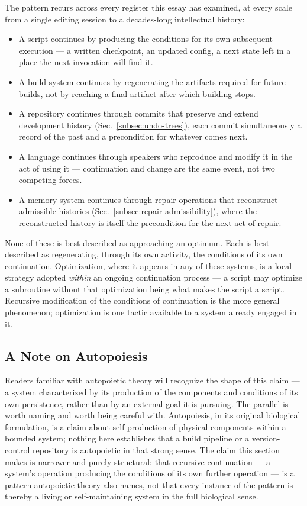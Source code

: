 \documentclass[12pt,a4paper]{article}
\theoremstyle{plain}
\theoremstyle{definition}
\theoremstyle{remark}
\begin{document}
The pattern recurs across every register this essay has examined, at every scale from a single editing session to a decades-long intellectual history:
\begin{itemize}
  \item A script continues by producing the conditions for its own subsequent execution — a written checkpoint, an updated config, a next state left in a place the next invocation will find it.
  \item A build system continues by regenerating the artifacts required for future builds, not by reaching a final artifact after which building stops.
  \item A repository continues through commits that preserve and extend development history (Sec.~\ref{subsec:undo-trees}), each commit simultaneously a record of the past and a precondition for whatever comes next.
  \item A language continues through speakers who reproduce and modify it in the act of using it — continuation and change are the same event, not two competing forces.
  \item A memory system continues through repair operations that reconstruct admissible histories (Sec.~\ref{subsec:repair-admissibility}), where the reconstructed history is itself the precondition for the next act of repair.
\end{itemize}
None of these is best described as approaching an optimum. Each is best described as regenerating, through its own activity, the conditions of its own continuation. Optimization, where it appears in any of these systems, is a local strategy adopted \emph{within} an ongoing continuation process — a script may optimize a subroutine without that optimization being what makes the script a script. Recursive modification of the conditions of continuation is the more general phenomenon; optimization is one tactic available to a system already engaged in it.

\subsection{A Note on Autopoiesis}
\label{subsec:autopoiesis-note}

Readers familiar with autopoietic theory will recognize the shape of this claim — a system characterized by its production of the components and conditions of its own persistence, rather than by an external goal it is pursuing. The parallel is worth naming and worth being careful with. Autopoiesis, in its original biological formulation, is a claim about self-production of physical components within a bounded system; nothing here establishes that a build pipeline or a version-control repository is autopoietic in that strong sense. The claim this section makes is narrower and purely structural: that recursive continuation — a system's operation producing the conditions of its own further operation — is a pattern autopoietic theory also names, not that every instance of the pattern is thereby a living or self-maintaining system in the full biological sense.
\end{document}
